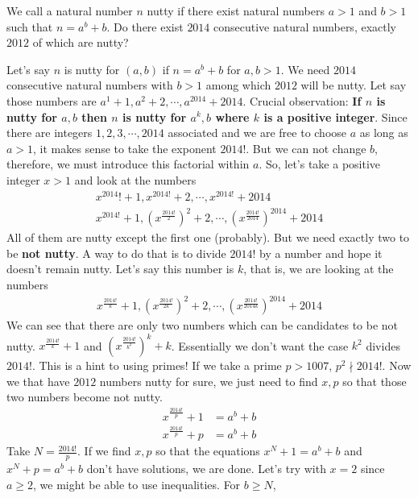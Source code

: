 \documentclass[problems.tex]{subfile}
\begin{document}
	\begin{problem}
		We call a natural number $n$ nutty if there exist natural numbers $a > 1$ and $b > 1$ such that $n = a^b + b$. Do there exist $2014$ consecutive natural numbers, exactly $2012$ of which are nutty?
	\end{problem}

	\begin{solution}
		Let's say $n$ is nutty for $(a,b)$ if $n=a^b+b$ for $a,b>1$. We need $2014$ consecutive natural numbers with $b>1$ among which $2012$ will be nutty. Let say those numbers are $a^1+1,a^2+2,\cdots,a^{2014}+2014$. Crucial observation: \textbf{If $n$ is nutty for $a,b$ then $n$ is nutty for $a^k,b$ where $k$ is a positive integer}. Since there are integers $1,2,3,\cdots,2014$ associated and we are free to choose $a $ as long as $a>1$, it makes sense to take the exponent $2014!$. But we can not change $b$, therefore, we must introduce this factorial within $a$. So, let's take a positive integer $x>1$ and look at the numbers
			\begin{align*}
				x^{2014}!+1,x^{2014!}+2,\cdots,x^{2014!}+2014\\
				x^{2014!}+1,\left(x^{\frac{2014!}{2}}\right)^2+2,\cdots,\left(x^{\frac{2014!}{2014}}\right)^{2014}+2014
			\end{align*}
		All of them are nutty except the first one (probably). But we need exactly two to be \textbf{not nutty}. A way to do that is to divide $2014!$ by a number and hope it doesn't remain nutty. Let's say this number is $k$, that is, we are looking at the numbers
			\begin{align*}
				x^{\frac{2014!}{k}}+1,\left(x^{\frac{2014!}{2k}}\right)^2+2,\cdots,\left(x^{\frac{2014!}{2014k}}\right)^{2014}+2014
			\end{align*}
		We can see that there are only two numbers which can be candidates to be not nutty. $x^{\frac{2014!}{k}}+1$ and $\left(x^{\frac{2014!}{k^2}}\right)^k+k$. Essentially we don't want the case $k^2$ divides $2014!$. This is a hint to using primes! If we take a prime $p>1007$, $p^2\nmid2014!$. Now we that have $2012$ numbers nutty for sure, we just need to find $x,p$ so that those two numbers become not nutty.
			\begin{align*}
				x^{\frac{2014!}{p}}+1 & = a^b+b\\
				x^{\frac{2014!}{p}}+p & = a^b+b
			\end{align*}
		Take $N = \frac{2014!}{p}$. If we find $x,p$ so that the equations $x^N+1=a^b+b$ and $x^N+p = a^b+b$ don't have solutions, we are done. Let's try with $x=2$ since $a\geq2$, we might be able to use inequalities. For $b\geq N$,

\end{solution}
\end{document}
